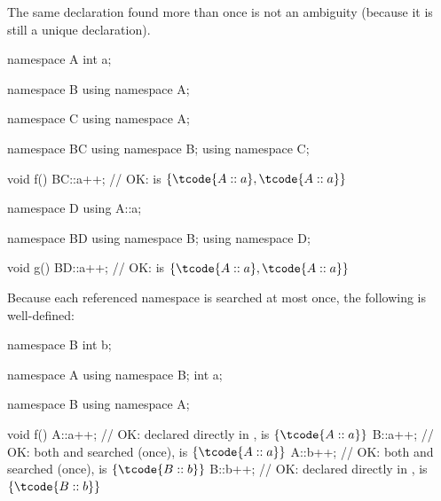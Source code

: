 \pnum
\begin{note}
The same declaration found more than once is not an ambiguity (because
it is still a unique declaration).
\begin{example}
\begin{codeblock}
namespace A {
  int a;
}

namespace B {
  using namespace A;
}

namespace C {
  using namespace A;
}

namespace BC {
  using namespace B;
  using namespace C;
}

void f()
{
  BC::a++;          // OK:  is $\{ \tcode{A::a}, \tcode{A::a} \}$
}

namespace D {
  using A::a;
}

namespace BD {
  using namespace B;
  using namespace D;
}

void g()
{
  BD::a++;          // OK:  is $\{ \tcode{A::a}, \tcode{A::a} \}$
}
\end{codeblock}
\end{example}
\end{note}

\pnum
\begin{example}
Because each referenced namespace is searched at most once, the
following is well-defined:

\begin{codeblock}
namespace B {
  int b;
}

namespace A {
  using namespace B;
  int a;
}

namespace B {
  using namespace A;
}

void f()
{
  A::a++;           // OK:  declared directly in ,  is $\{ \tcode{A::a} \}$
  B::a++;           // OK: both  and  searched (once),  is $\{ \tcode{A::a} \}$
  A::b++;           // OK: both  and  searched (once),  is $\{ \tcode{B::b} \}$
  B::b++;           // OK:  declared directly in ,  is $\{ \tcode{B::b} \}$
}
\end{codeblock}
\end{example}

